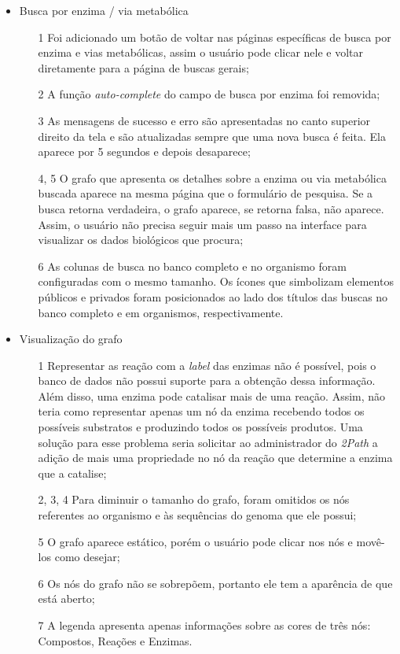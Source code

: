 \begin{itemize}
\item Busca por enzima / via metabólica
  \begin{itemize}
  \item[1] Foi adicionado um botão de voltar nas páginas específicas de busca por enzima e vias metabólicas, assim o usuário pode clicar nele e voltar diretamente para a página de buscas gerais;
  \item[2] A função \textit{auto-complete} do campo de busca por enzima foi removida;
  \item[3] As mensagens de sucesso e erro são apresentadas no canto superior direito da tela e são atualizadas sempre que uma nova busca é feita. Ela aparece por 5 segundos e depois desaparece;
  \item[4, 5] O grafo que apresenta os detalhes sobre a enzima ou via metabólica buscada aparece na mesma página que o formulário de pesquisa. Se a busca retorna verdadeira, o grafo aparece, se retorna falsa, não aparece. Assim, o usuário não precisa seguir mais um passo na interface para visualizar os dados biológicos que procura;
  \item[6] As colunas de busca no banco completo e no organismo foram configuradas com o mesmo tamanho. Os ícones que simbolizam elementos públicos e privados foram posicionados ao lado dos títulos das buscas no banco completo e em organismos, respectivamente.
  \end{itemize}
  
\item Visualização do grafo
  \begin{itemize} 
  \item[1] Representar as reação com a \textit{label} das enzimas não é possível, pois o banco de dados não possui suporte para a obtenção dessa informação. Além disso, uma enzima pode catalisar mais de uma reação. Assim, não teria como representar apenas um nó da enzima recebendo todos os possíveis substratos e produzindo todos os possíveis produtos. Uma solução para esse problema seria solicitar ao administrador do \textit{2Path} a adição de mais uma propriedade no nó da reação que determine a enzima que a catalise;
  \item[2, 3, 4] Para diminuir o tamanho do grafo, foram omitidos os nós referentes ao organismo e às sequências do genoma que ele possui;
  \item[5] O grafo aparece estático, porém o usuário pode clicar nos nós e movê-los como desejar;
  \item[6] Os nós do grafo não se sobrepõem, portanto ele tem a aparência de que está aberto;
  \item[7] A legenda apresenta apenas informações sobre as cores de três nós: Compostos, Reações e Enzimas.
  \end{itemize}
\end{itemize}
 
